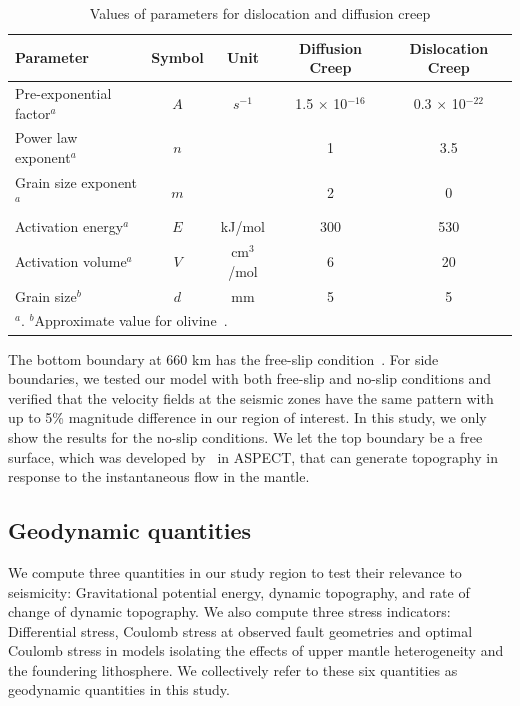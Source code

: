\documentclass[draft,linenumbers]{agujournal2018}
\begin{document}
\begin{table}[ht] 
    \caption{Values of parameters for dislocation and diffusion creep}
    \centering
    \begin{tabular}{l c c c c}
    \hline
     Parameter  & Symbol & Unit & Diffusion Creep & Dislocation Creep  \\
    \hline
      Pre-exponential factor$^a$ & $A$ & $s^{-1}$ & 1.5 $\times$ 10$^{-16}$ & 0.3 $\times$ 10$^{-22}$   \\
      Power law exponent$^a$ & $n$ & & 1 & 3.5  \\
      Grain size exponent$^a$  & $m$ & & 2 & 0   \\
      Activation energy$^a$  & $E$ & kJ/mol & 300 & 530   \\
      Activation volume$^a$  & $V$ & cm$^3$/mol & 6 & 20 \\
      Grain size$^b$         & $d$ & mm & 5 & 5 \\
    \hline
    \multicolumn{5}{l}{$^{a}$\citet{karato1993rheology}. $^b$Approximate value for olivine~\citep{karato1984grain}.}
    \end{tabular}
    \label{table_model}
\end{table}
%
The bottom boundary at 660 km has the free-slip condition~\citep[e.g.,][]{arcay2007slab, billen2007rheologic, quinquis2011role}. For side boundaries, we tested our model with both free-slip and no-slip conditions and verified that the velocity fields at the seismic zones have the same pattern with up to 5\% magnitude difference in our region of interest. In this study, we only show the results for the no-slip conditions. We let the top boundary be a free surface, which was developed by~\citet{rose_freesurface} in ASPECT, that can generate topography in response to the instantaneous flow in the mantle. 

\subsection{Geodynamic quantities}
We compute three quantities in our study region to test their relevance to seismicity: Gravitational potential energy, dynamic topography, and rate of change of dynamic topography. We also compute three stress indicators: Differential stress, Coulomb stress at observed fault geometries and optimal Coulomb stress in models isolating the effects of upper mantle heterogeneity and the foundering lithosphere. We collectively refer to these six quantities as geodynamic quantities in this study.
\end{document}
